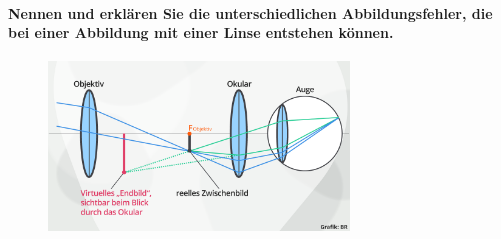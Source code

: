 \documentclass[a4paper, 11pt, ngerman, parskip=half]{scrartcl}
\begin{document}
\paragraph{Nennen und erklären Sie die unterschiedlichen Abbildungsfehler, die bei einer Abbildung
mit einer Linse entstehen können.}

\begin{figure}[H]
    \centering
    \includegraphics[width=8cm]{image/18/geo23}
\end{figure}
\end{document}
